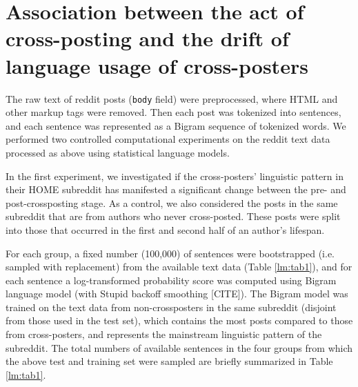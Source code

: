 \documentclass{article}
\begin{document}
\section{Association between the act of cross-posting and the drift of language usage of cross-posters}

The raw text of reddit posts (\texttt{body} field) were preprocessed, where HTML and other markup tags were removed. Then each post was tokenized into sentences, and each sentence was represented as a Bigram sequence of tokenized words. We performed two controlled computational experiments on the reddit text data processed as above using statistical language models.

In the first experiment, we investigated if the cross-posters' linguistic pattern in their HOME subreddit has manifested a significant change between the pre- and post-crossposting stage. As a control, we also considered the posts in the same subreddit that are from authors who never cross-posted. These posts were split into those that occurred in the first and second half of an author's lifespan. 

For each group, a fixed number (100,000) of sentences were bootstrapped (i.e. sampled with replacement) from the available text data (Table \ref{lm:tab1}), and for each sentence a log-transformed probability score was computed using Bigram language model (with Stupid backoff smoothing [CITE]). The Bigram model was trained on the text data from non-crossposters in the same subreddit (disjoint from those used in the test set), which contains the most posts compared to those from cross-posters, and represents the mainstream linguistic pattern of the subreddit. The total numbers of available sentences in the four groups from which the above test and training set were sampled are briefly summarized in Table \ref{lm:tab1}. 
\end{document}
